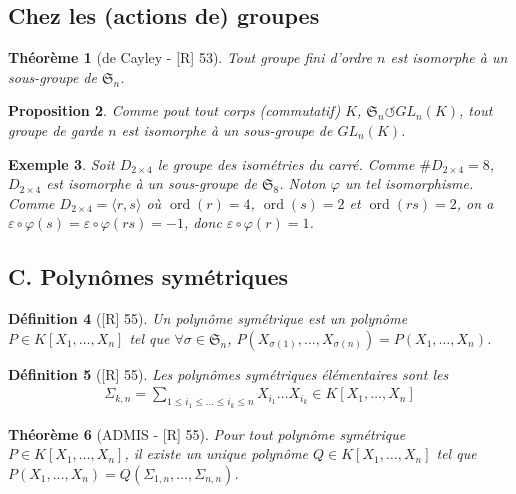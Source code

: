 \documentclass[10pt, a4paper, parskip=full, twoside, twocolumn]{report}
\newtheorem{definition}{Définition}
\newtheorem{theorem}[definition]{Théorème}
\newtheorem{proposition}[definition]{Proposition}
\newtheorem{example}[definition]{Exemple}
\newcommand{\actson}{\circlearrowleft}
\DeclareMathOperator{\ord}{ord}
\begin{document}
\subsection*{Chez les (actions de) groupes}
\begin{theorem}[de Cayley - \textnormal{[R] 53}]
	Tout groupe fini d'ordre $n$ est isomorphe à un sous-groupe de $\mathfrak{S}_n$.
\end{theorem}
\begin{proposition}
	Comme pout tout corps (commutatif) $K$, $\mathfrak{S}_n\actson GL_n(K)$, tout groupe de garde $n$ 
	est isomorphe à un sous-groupe de $GL_n(K)$.
\end{proposition}

\begin{example}
	Soit $D_{2\times 4}$ le groupe des isométries du carré. Comme $\#D_{2\times 4} = 8$, $D_{2\times 4}$ est isomorphe à un sous-groupe de $\mathfrak{S}_8$. Noton $\varphi$ un tel isomorphisme.
	Comme $D_{2\times 4} = \langle r, s\rangle$ où $\ord(r) = 4$, $\ord(s) = 2$ et $\ord(rs) = 2$, on a $\varepsilon\circ \varphi(s)=\varepsilon\circ \varphi(rs) = -1$, donc $\varepsilon\circ \varphi(r) = 1$.
\end{example}

\subsection*{C. Polynômes symétriques}
\begin{definition}[\textnormal{[R] 55}]
	Un \emph{polynôme symétrique} est un polynôme $P\in K[X_1,\dots,X_n]$
	tel que $\forall\sigma\in\mathfrak{S}_n$, $P(X_{\sigma(1)},\dots,X_{\sigma(n)}) = P(X_1,\dots,X_n)$.
\end{definition}

\begin{definition}[\textnormal{[R] 55}]
	Les \emph{polynômes symétriques élémentaires} sont les 
	\begin{align*}
		\Sigma_{k,n} = \sum_{1\leq i_1\leq\dots\leq i_k\leq n} X_{i_1}\dots X_{i_k}\in K[X_1,\dots,X_n]
	\end{align*}
\end{definition}

\begin{theorem}[ADMIS - \textnormal{[R] 55}]
	Pour tout polynôme symétrique $P\in K[X_1,\dots,X_n]$, il
	existe un unique polynôme $Q\in K[X_1,\dots,X_n]$ tel que 
	$P(X_1,\dots,X_n) = Q(\Sigma_{1,n},\dots,\Sigma_{n,n})$.
\end{theorem}
\end{document}
